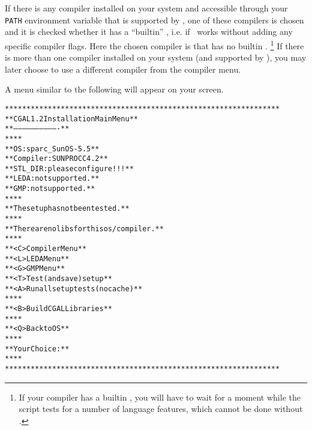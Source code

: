 If there is any compiler installed on your system and accessible
through your \texttt{PATH} environment variable that is supported by
\cgal, one of these compilers is chosen and it is checked whether it
has a ``builtin'' \stl, i.e. if \stl\ works without adding any
specific compiler flags.  Here the chosen compiler is 
that has no builtin \stl.  \footnote{If your compiler has a builtin
  \stl, you will have to wait for a moment while the script tests for
  a number of language features, which cannot be done without \stl.}
If there is more than one compiler installed on your system (and
supported by \cgal), you may later choose to use a different compiler
from the compiler menu.

A menu similar to the following will appear on your screen.

{\scriptsize \label{pic:main-menu}
\begin{alltt}
  ****************************************************************
  **              CGAL 1.2 Installation Main Menu               **
  **              -------------------------------               **
  **                                                            **
  **   OS:                  sparc_SunOS-5.5                     **
  **   Compiler:            SUNPRO CC 4.2                       **
  **   STL_DIR:             please configure!!!                 **
  **   LEDA:                not supported.                      **
  **   GMP:                 not supported.                      **
  **                                                            **
  **   The setup has not been tested.                           **
  **                                                            **
  **   There are no libs for this os/compiler.                  **
  **                                                            **
  **   <C>  Compiler Menu                                       **
  **   <L>  LEDA Menu                                           **
  **   <G>  GMP Menu                                            **
  **   <T>  Test (and save) setup                               **
  **   <A>  Run all setup tests (no cache)                      **
  **                                                            **
  **   <B>  Build CGAL Libraries                                **
  **                                                            **
  **   <Q>  Back to OS                                          **
  **                                                            **
  **   Your Choice:                                             **
  **                                                            **
  ****************************************************************
\end{alltt}}

